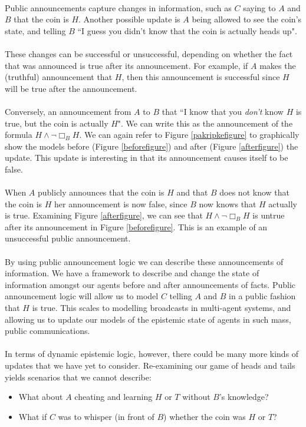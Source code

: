\\
Public announcements capture changes in information, such as $C$ saying to
$A$ and $B$ that the coin is $H$.
Another possible update is $A$ being allowed to see the coin's state, and
telling $B$ ``I guess you didn't know that the coin is actually heads up".\\
\\
These changes can be successful or unsuccessful, depending on whether the fact
that was announced is true after its announcement.
For example, if $A$ makes the (truthful) announcement that $H$, then this
announcement is successful since $H$ will be true after the announcement.\\
\\
Conversely, an announcement from $A$ to $B$ that ``I know that you {\em don't} know $H$
is true, but the coin is actually $H$".
We can write this as the announcement of the formula $H \land \neg \Box_B H$.
We can again refer to Figure \ref{pakripkefigure} to graphically show the models
before (Figure \ref{beforefigure}) and after (Figure \ref{afterfigure}) the update.
This update is interesting in that its announcement causes itself to be false.\\
\\
When $A$ publicly announces that the coin is $H$ and that $B$ does not know that
the coin is $H$ her announcement is now false, since $B$ now knows that $H$
actually is true.
Examining Figure \ref{afterfigure}, we can see that $H \land \neg \Box_B H$ is
untrue after its announcement in Figure \ref{beforefigure}.
This is an example of an unsuccessful public announcement.\\
\\
By using public announcement logic we can describe these announcements of
information.
We have a framework to describe and change the state of information amongst our
agents before and after announcements of facts.
Public announcement logic will allow us to model $C$ telling $A$ and $B$ in a
public fashion that $H$ is true.
This scales to modelling broadcasts in multi-agent systems, and allowing us to
update our models of the epistemic state of agents in such mass, public communications.\\
\\
In terms of dynamic epistemic logic, however, there could be many more kinds of
updates that we have yet to consider.
Re-examining our game of heads and tails yields scenarios that we cannot
describe:
\begin{itemize}
	\item What about $A$ cheating and learning $H$ or $T$ without $B$'s knowledge?
	\item What if $C$ was to whisper (in front of $B$) whether the coin was $H$
	or $T$?
\end{itemize}
